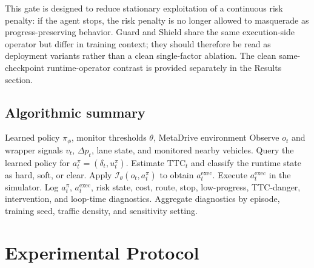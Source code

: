 \documentclass[pdflatex,sn-mathphys-ay]{sn-jnl}
\begin{document}
This gate is designed to reduce stationary exploitation of a continuous risk penalty: if the agent stops, the risk penalty is no longer allowed to masquerade as progress-preserving behavior. Guard and Shield share the same execution-side operator but differ in training context; they should therefore be read as deployment variants rather than a clean single-factor ablation. The clean same-checkpoint runtime-operator contrast is provided separately in the Results section.



\subsection{Algorithmic summary}\label{sec_algorithm}
\begin{algorithm}[t]
\footnotesize
\caption{GuardShield-Runtime closed-loop execution}
\label{alg_runtime}
\begin{algorithmic}[1]
\Require Learned policy $\pi_\phi$, monitor thresholds $\theta$, MetaDrive environment
\State Observe $o_t$ and wrapper signals $v_t$, $\Delta p_t$, lane state, and monitored nearby vehicles.
\State Query the learned policy for $a_t^\pi=(\delta_t,u_t^\pi)$.
\State Estimate $\mathrm{TTC}_t$ and classify the runtime state as hard, soft, or clear.
\State Apply $\mathcal{I}_\theta(o_t,a_t^\pi)$ to obtain $a_t^{\mathrm{exec}}$.
\State Execute $a_t^{\mathrm{exec}}$ in the simulator.
\State Log $a_t^\pi$, $a_t^{\mathrm{exec}}$, risk state, cost, route, stop, low-progress, TTC-danger, intervention, and loop-time diagnostics.
\EndFor
\State Aggregate diagnostics by episode, training seed, traffic density, and sensitivity setting.
\end{algorithmic}
\end{algorithm}

\section{Experimental Protocol}\label{sec_experimental_protocol}
\end{document}
